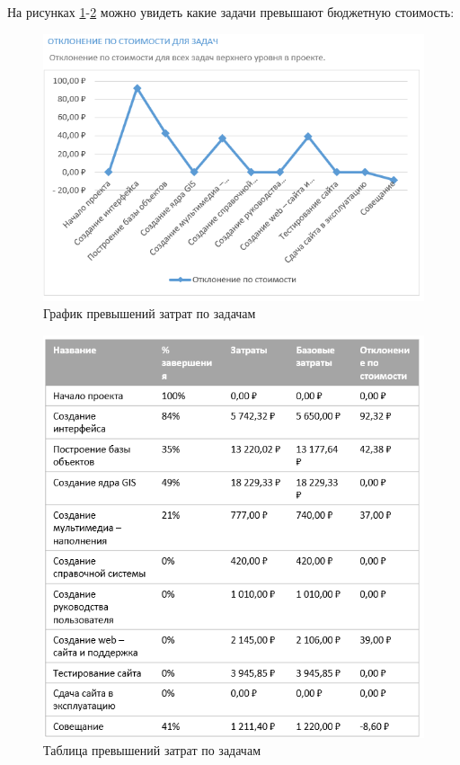 \newpage
На рисунках \ref{p2}-\ref{p3} можно увидеть какие задачи превышают бюджетную стоимость:
\begin{figure}[!h]
	\centering
	\includegraphics[width=0.7\linewidth]{inc/img/2.png}
	\caption{График превышений затрат по задачам}
	\label{p2}
\end{figure}

\begin{figure}[!h]
	\centering
	\includegraphics[width=0.7\linewidth]{inc/img/3.png}
	\caption{Таблица превышений затрат по задачам}
	\label{p3}
\end{figure}


\newpage
